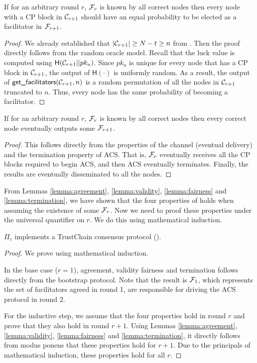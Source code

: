 \begin{lemma}
\label{lemma:fairness}
If for an arbitrary round $r$,
$\mathcal{F}_r$ is known by all correct nodes then
every node with a CP block in $\mathcal{C}_{r+1}$ should have an equal probability to be elected as a facilitator in $\mathcal{F}_{r+1}$.
\end{lemma}
\begin{proof}
We already established that $|\mathcal{C}_{r+1}| \ge N - t \ge n$ from .
Then the proof directly follows from the random oracle model.
Recall that the luck value is computed using $\textsf{H}(\mathcal{C}_{r+1} || pk_u)$.
Since $pk_u$ is unique for every node that has a CP block in $\mathcal{C}_{r+1}$,
the output of $\textsf{H}(\cdot)$ is uniformly random.
As a result, the output of $\textsf{get\_facilitators}(\mathcal{C}_{r+1}, n)$ is a random permutation of all the nodes in $\mathcal{C}_{r+1}$ truncated to $n$.
Thus, every node has the same probability of becoming a facilitator.
\end{proof}

\begin{lemma}
\label{lemma:termination}
If for an arbitrary round $r$,
$\mathcal{F}_r$ is known by all correct nodes then
every correct node eventually outputs some $\mathcal{F}_{r + 1}$.
\end{lemma}
\begin{proof}
This follows directly from the properties of the channel (eventual delivery)
and the termination property of ACS.
That is, $\mathcal{F}_r$ eventually receives all the CP blocks required to begin ACS,
and then ACS eventually terminates.
Finally, the results are eventually disseminated to all the nodes.
\end{proof}

From Lemmas \ref{lemma:agreement}, \ref{lemma:validity}, \ref{lemma:fairness} and \ref{lemma:termination},
we have shown that the four properties of  holds when assuming the existence of some $\mathcal{F}_r$.
Now we need to proof these properties under the universal quantifier on $r$.
We do this using mathematical induction.

\begin{theorem}
\label{theorem:consensus}
$\Pi_c$ implements a TrustChain consensus protocol ().
\end{theorem}
\begin{proof}
We prove using mathematical induction.

In the base case ($r = 1$), agreement, validity fairness and termination follows directly from the bootstrap protocol.
Note that the result is $\mathcal{F}_1$,
which represents the set of facilitators agreed in round 1,
are responsible for driving the ACS protocol in round 2.

For the inductive step,
we assume that the four properties hold in round $r$ and prove that they also hold in round $r + 1$.
Using Lemmas \ref{lemma:agreement}, \ref{lemma:validity}, \ref{lemma:fairness} and \ref{lemma:termination},
it directly follows from modus ponens that these properties hold for $r + 1$.
Due to the principals of mathematical induction, these properties hold for all $r$.
\end{proof}

